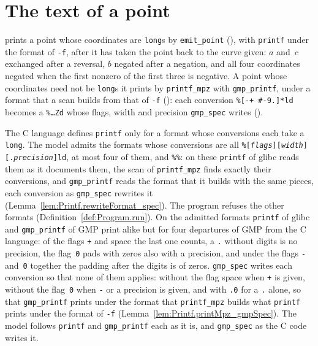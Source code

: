 \section{The text of a point}\label{sec:printf}

\jpoints{} prints a point whose coordinates are \texttt{long}s by \texttt{emit\_point}
(), with \texttt{printf} under the format of \texttt{-f}, after it
has taken the point back to the curve given: $a$ and~$c$ exchanged after a reversal, $b$ negated
after a negation, and all four coordinates negated when the first nonzero of the first three is
negative. A point whose coordinates need not be \texttt{long}s it prints by \texttt{printf\_mpz}
with \texttt{gmp\_printf}, under a format that a scan builds from that of \texttt{-f}
(): each conversion \texttt{\%[-+~\#-9.]*ld}
becomes a \texttt{\%\dots Zd} whose flags, width and precision \texttt{gmp\_spec} writes
().

The C language defines \texttt{printf} only for a format whose conversions each take a
\texttt{long}. The model admits the formats whose conversions are all
\texttt{\%[\textit{flags}][\textit{width}][.\textit{precision}]ld}, at most four of them, and
\texttt{\%\%}: on these \texttt{printf} of glibc reads them as it documents them, the scan of
\texttt{printf\_mpz} finds exactly their conversions, and \texttt{gmp\_printf} reads the format that
it builds with the same pieces, each conversion as \texttt{gmp\_spec} rewrites it
(Lemma~\ref{lem:Printf.rewriteFormat_spec}). The program refuses the other formats
(Definition~\ref{def:Program.run}). On the admitted formats \texttt{printf} of glibc and
\texttt{gmp\_printf} of GMP print alike but for four departures of GMP from the C language: of the
flags \texttt{+} and space the last one counts, a \texttt{.} without digits is no precision, the
flag~\texttt{0} pads with zeros also with a precision, and under the flags \texttt{-} and~\texttt{0}
together the padding after the digits is of zeros. \texttt{gmp\_spec} writes each conversion so that
none of them applies: without the flag space when \texttt{+} is given, without the flag~\texttt{0}
when \texttt{-} or a precision is given, and with \texttt{.0} for a \texttt{.} alone, so that
\texttt{gmp\_printf} prints under the format that \texttt{printf\_mpz} builds what \texttt{printf}
prints under the format of \texttt{-f} (Lemma~\ref{lem:Printf.printMpz_gmpSpec}). The model
follows \texttt{printf} and \texttt{gmp\_printf} each as it is, and \texttt{gmp\_spec} as the C code
writes it.


